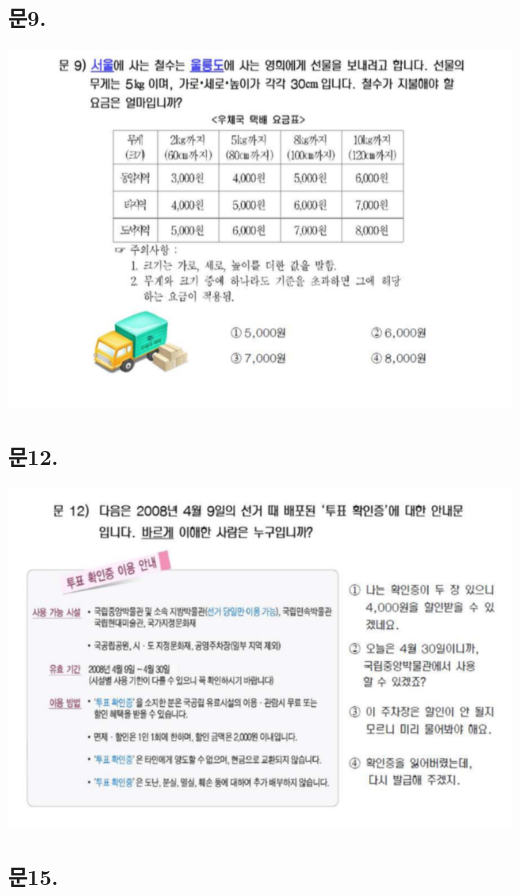 \documentclass[
]{book}
\begin{document}
\subsection{문9.}\label{uxbb389.}

\begin{flushleft}\includegraphics[width=0.75\linewidth]{./pics/Q09} \end{flushleft}

\subsection{문12.}\label{uxbb3812.}

\begin{flushleft}\includegraphics[width=0.75\linewidth]{./pics/Q12} \end{flushleft}

\subsection{문15.}\label{uxbb3815.}
\end{document}
